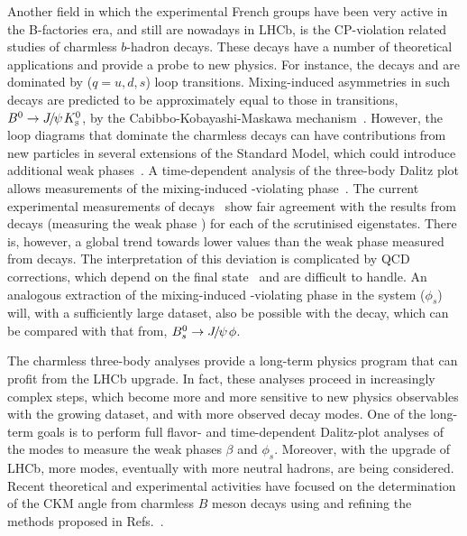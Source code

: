 Another field in which the experimental French groups have been  very active in the B-factories era, and still are nowadays in LHCb, is the CP-violation related studies of charmless $b$-hadron decays.  These decays have a number of theoretical applications and provide a probe to new physics. For instance, the decays \BdtoKsPiPi and \BdtoKsKK are dominated by \btoqqbars ($q = u,d,s$) loop transitions.  Mixing-induced \CP asymmetries in such decays are predicted to be approximately equal to those in \btoccbars transitions, \eg ${{B}^0}\rightarrow{\ensuremath{{J\mskip -3mu/\mskip -2mu\psi\mskip 2mu}}}{\ensuremath{{K}^0_{\rm\scriptscriptstyle S}}}$, by the
Cabibbo-Kobayashi-Maskawa mechanism~\cite{Cabibbo:1963yz,Kobayashi:1973fv}.
However, the loop diagrams that dominate the charmless decays can have
contributions from new particles in several extensions of the Standard Model,
which could introduce additional weak phases~\cite{Buchalla:2005us,Grossman:1996ke,London:1997zk,Ciuchini:1997zp}.
A time-dependent analysis of the three-body Dalitz plot allows measurements of
the mixing-induced \CP-violating
phase~\cite{Dalseno:2008wwa,Aubert:2009me,Nakahama:2010nj,Lees:2012kxa}. 
 The current experimental measurements of \btoqqbars decays~\cite{HFAG} show
fair agreement with the results from \btoccbars decays (measuring the weak
phase \Pbeta) for each of the scrutinised \CP eigenstates.
There is, however, a global trend towards lower values than the weak phase
measured from \btoccbars decays.
The interpretation of this deviation is complicated by QCD
corrections, which depend on the final state~\cite{Silvestrini:2007yf} and
are difficult to handle.
An analogous extraction of the mixing-induced \CP-violating phase in the
\Bs system ($\phi_s$) will, with a sufficiently large dataset, also be possible with
the \BstoKsKPi decay, which can be compared with that from, \eg
${{B}^0_{s}}\rightarrow{\ensuremath{{J\mskip -3mu/\mskip -2mu\psi\mskip 2mu}}}\phi$.

The charmless three-body analyses provide a long-term physics program that can profit from the LHCb upgrade. In fact, these analyses proceed in increasingly complex steps, which become more and more sensitive to new physics observables with the growing dataset, and with more observed decay modes. One of the long-term goals is to perform full flavor- and time-dependent Dalitz-plot analyses of the \BstoKshhp modes to measure the weak phases $\beta$ and $\phi_s$. Moreover, with the upgrade of LHCb, more modes, eventually with more neutral hadrons, are being considered. Recent theoretical and experimental activities have focused on the determination of the CKM angle \Pgamma from charmless $B$ meson decays using and refining the methods proposed in Refs.~\cite{Ciuchini:2006kv,Gronau:2006qn,Bhattacharya:2013cla}.  




